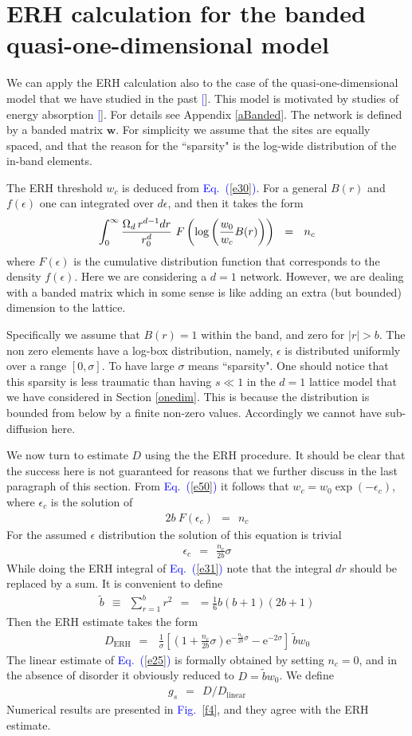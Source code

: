 \documentclass[aps,pre,floats,floatfix,twocolumn]{revtex4}
\newcommand{\eexp}{\mbox{e}^}
\newcommand{\mylabel}[1]{\label{#1}}
\newcommand{\beq}{\begin{eqnarray}}
\newcommand{\eeq}{\end{eqnarray}}
\newcommand{\be}[1]{\begin{eqnarray}\ifthenelse{#1=-1}
{\nonumber}{\ifthenelse{#1=0}{}{\mylabel{e#1}}}}
\newcommand{\Eq}[1]{\textcolor{blue}{Eq.\!\!~(\ref{#1})}}
\newcommand{\Fig}[1]{\textcolor{blue}{Fig.}\!\!~\ref{#1}}
\newcommand{\rmrk}[1]{#1}
\renewcommand{\cite}[1]{\textcolor{blue}{[\onlinecite{#1}}]} %
\begin{document}
\section{ERH calculation for the banded quasi-one-dimensional model}

\label{sBanded}


We can apply the ERH calculation also to the case 
of the quasi-one-dimensional model that we have 
studied in the past \cite{kbd,kbw}.
This model is motivated by studies of energy absorption \cite{slk}.
For details see Appendix \ref{aBanded}.
%
The network is defined by a banded matrix $\bm{w}$.
\rmrk{For simplicity} we assume that the sites  are equally 
spaced, and that the reason for the ``sparsity" is the log-wide 
distribution of the in-band elements. 
 

The ERH threshold $w_c$ is deduced from \Eq{e30}. 
For a general $B(r)$ and $f(\epsilon)$ one can integrated 
over $d\epsilon$, and then it takes the form 
%
\be{50}
\int_0^{\infty}  
\frac{\Omega_d \, r^{d-1}dr}{r_0^{d}} 
\ F\left(\log\left(\frac{w_0}{w_c}B(r)\right)\right) 
\ \ = \ \ n_c
\eeq 
%
where $F(\epsilon)$ is the cumulative distribution function 
that corresponds to the density $f(\epsilon)$.
Here we are considering a $d{=}1$ network. 
\rmrk{However, we are dealing with a banded matrix  
which in some sense is like adding 
an extra (but bounded) dimension to the lattice.} 
 
Specifically we assume that ${B(r)=1}$ within the band, 
and zero for ${|r|>b}$. 
The non zero elements have a log-box distribution, 
namely, $\epsilon$ is distributed uniformly over a range $[0,\sigma]$. 
To have large $\sigma$ means ``sparsity".
One should notice that this sparsity is less 
traumatic than having $s\ll1$ in the $d{=}1$ lattice model 
that we have considered in Section \ref{onedim}.
This is because the distribution is bounded 
from below by a finite non-zero values. 
Accordingly we cannot have sub-diffusion here.  

We now turn to estimate $D$ using the 
the ERH procedure. It should be clear that the 
success here is not guaranteed for reasons 
that we further discuss in the last paragraph
of this section.
%  
From \Eq{e50} it follows that ${w_c=w_0\exp(-\epsilon_c)}$, 
where $\epsilon_c$ is the solution of 
%
\beq
2b \ F\left( \epsilon_c \right) \ \ = \ \ n_c
\eeq
%
For the assumed $\epsilon$ distribution the 
solution of this equation is trivial 
%
\beq
\epsilon_c \ \ = \ \ \frac{n_c}{2b}\sigma
\eeq
%
While doing the ERH integral of \Eq{e31} note that 
the integral $dr$ should be replaced by a sum.
It is convenient to define
%
\beq
\tilde{b} \ \ \equiv \ \ \sum_{r=1}^b r^2 \ \ = \ \ = \frac{1}{6}b(b+1)(2b+1)
\eeq
%
Then the ERH estimate takes the form
%
\beq
D_{\text{ERH}} \ \ = \ \ 
\ \frac{1}{\sigma}\left[ 
\left(1+\frac{n_c}{2b}\sigma\right)\eexp{-\frac{n_c}{2b}\sigma} - \eexp{-2\sigma}
\right] \ \tilde{b} w_0
\eeq 
% 
The linear estimate of \Eq{e25} is formally obtained 
by setting ${n_c=0}$, and in the absence 
of disorder it obviously reduced to $D=\tilde{b} w_0$. 
We define 
%
\beq
g_s \ \ = \ \ D/D_{\text{linear}}
\eeq
%
Numerical results are presented in \Fig{f4}, 
and they agree with the ERH estimate.
\end{document}

